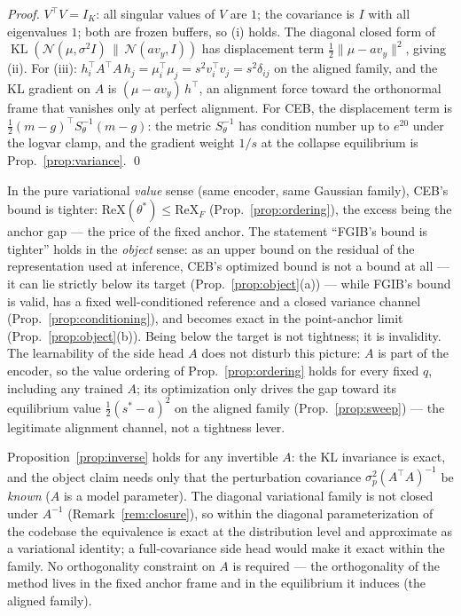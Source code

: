 \begin{proof}
$V^{\top}V = I_K$: all singular values of $V$ are $1$; the covariance is $I$ with all
eigenvalues $1$; both are frozen buffers, so (i) holds. The diagonal closed form of
$\operatorname{KL}(\mathcal{N}(\mu, \sigma^2 I)\,\|\,\mathcal{N}(a v_y, I))$ has
displacement term $\tfrac12\|\mu - a v_y\|^2$, giving (ii). For (iii):
$h_i^{\top} A^{\top} A\, h_j = \mu_i^{\top}\mu_j = s^2 v_i^{\top} v_j = s^2\delta_{ij}$
on the aligned family, and the KL gradient on $A$ is
$(\mu - a v_y)\,h^{\top}$, an alignment force toward the orthonormal frame that vanishes
only at perfect alignment. For CEB, the displacement term is
$\tfrac12(m - g)^{\top} S_\theta^{-1}(m - g)$: the metric $S_\theta^{-1}$ has condition
number up to $e^{20}$ under the logvar clamp, and the gradient weight $1/s$ at the
collapse equilibrium is Prop.~\ref{prop:variance}. \hfill\qed
\end{proof}

\begin{remark}\label{rem:senses}
In the pure variational \emph{value} sense (same encoder, same Gaussian family), CEB's
bound is tighter: $\mathrm{ReX}(\theta^*) \le \mathrm{ReX}_F$
(Prop.~\ref{prop:ordering}), the excess being the anchor gap --- the price of the fixed
anchor. The statement ``FGIB's bound is tighter'' holds in the \emph{object} sense: as
an upper bound on the residual of the representation used at inference, CEB's optimized
bound is not a bound at all --- it can lie strictly below its target
(Prop.~\ref{prop:object}(a)) --- while FGIB's bound is valid, has a fixed
well-conditioned reference and a closed variance channel
(Prop.~\ref{prop:conditioning}), and becomes exact in the point-anchor limit
(Prop.~\ref{prop:object}(b)). Being below the target is not tightness; it is invalidity.
The learnability of the side head $A$ does not disturb this picture: $A$ is part of the
encoder, so the value ordering of Prop.~\ref{prop:ordering} holds for every fixed $q$,
including any trained $A$; its optimization only drives the gap toward its equilibrium
value $\tfrac12(s^*-a)^2$ on the aligned family (Prop.~\ref{prop:sweep}) --- the
legitimate alignment channel, not a tightness lever.
\end{remark}

\begin{remark}\label{rem:orth}
Proposition~\ref{prop:inverse} holds for any invertible $A$: the KL invariance is exact,
and the object claim needs only that the perturbation covariance
$\sigma_p^2(A^{\top}A)^{-1}$ be \emph{known} ($A$ is a model parameter). The diagonal
variational family is not closed under $A^{-1}$ (Remark~\ref{rem:closure}), so within
the diagonal parameterization of the codebase the equivalence is exact at the
distribution level and approximate as a variational identity; a full-covariance side
head would make it exact within the family. No orthogonality constraint on $A$ is
required --- the orthogonality of the method lives in the fixed anchor frame and in the
equilibrium it induces (the aligned family).
\end{remark}

